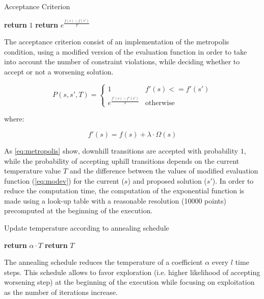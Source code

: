 \begin{homeworkProblem}
\begin{algorithm}
\caption{Acceptance Criterion}
\label{saTSPTW}
\begin{algorithmic}
  \State \textbf{return} $1$
\Else
  \State \textbf{return} $e^{\frac{f(s)-f(s')}{T}}$
\EndIf
\EndProcedure
\end{algorithmic}
\end{algorithm}

The acceptance criterion consist of an implementation of the metropolis condition, using a modified version of the evaluation function in order to take into account the number of constraint violations, while deciding whether to accept or not a worsening solution.

\begin{equation} \label{eq:metropolis}
  P(s,s',T) = \begin{cases}
               1 & f'(s) <= f'(s') \\
               e^{\frac{f'(s)-f'(s')}{T}} & \text{otherwise}
              \end{cases}
\end{equation}

where:

\begin{equation} \label{eq:modev}
  f'(s) = f(s) + \lambda \cdot \Omega(s)
\end{equation}

As \ref{eq:metropolis} show, downhill transitions are accepted with probability $1$, while the probability of accepting uphill transitions depends on the current temperature value $T$ and the difference between the values of modified evaluation function (\ref{eq:modev}) for the current ($s$) and proposed solution ($s'$).
In order to reduce the computation time, the computation of the exponential function is made using a look-up table with a reasonable resolution (10000 points) precomputed at the beginning of the execution.


\begin{algorithm}
\caption{Update temperature according to annealing schedule}
\label{saTSPTW}
\begin{algorithmic}
    \State \textbf{return} $\alpha \cdot T$
  \Else
    \State \textbf{return} $T$
  \EndIf
\EndProcedure
\end{algorithmic}
\end{algorithm}

The annealing schedule reduces the temperature of a coefficient $\alpha$ every $l$ time steps. 
This schedule allows to favor exploration (i.e. higher likelihood of accepting worsening step) at the beginning of the execution while focusing on exploitation as the number of iterations increase.


\end{homeworkProblem}		
